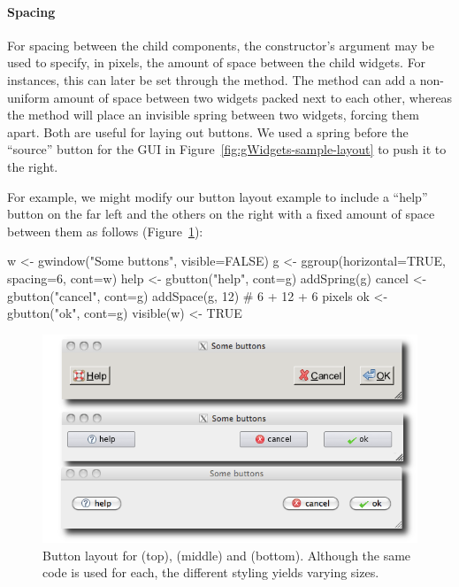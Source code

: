\paragraph{Spacing}
For spacing between the child components, the constructor's argument
 may be used to specify, in pixels, the
amount of space between the child widgets. For 
instances, this can later be set through the 
method. The method  can add a non-uniform
amount of space between two widgets packed next to each other, whereas
the method  will place an invisible spring
between two widgets, forcing them apart.  Both are useful for laying
out buttons. We used a spring before the ``source'' button for the GUI
in Figure~\ref{fig:gWidgets-sample-layout} to push it to the right.


For example, we might modify our button layout example to include a
``help'' button on the far left and the others on the right with a
fixed amount of space between them as follows (Figure~\ref{fig:gWidgets-button-layout}):
\begin{Schunk}
\begin{Sinput}
 w <- gwindow("Some buttons", visible=FALSE)
 g <- ggroup(horizontal=TRUE, spacing=6, cont=w)
 help <- gbutton("help", cont=g)
 addSpring(g)
 cancel <- gbutton("cancel", cont=g)
 addSpace(g, 12)                         # 6 + 12 + 6 pixels
 ok <- gbutton("ok", cont=g)
 visible(w) <- TRUE
\end{Sinput}
\end{Schunk}


\begin{figure}
  \centering
  \includegraphics[width=.7\textwidth]{fig-gWidgets-buttons}
  \caption{Button layout for  (top),  (middle)
    and  (bottom). Although the same code is used for each, the different styling yields varying sizes. }
  \label{fig:gWidgets-button-layout}
\end{figure}


